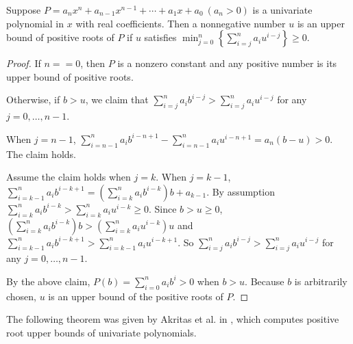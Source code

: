 \documentclass[10pt,a4paper]{article}
\begin{document}
\begin{theorem} \label{thm:log}
  Suppose   $P=a_nx^n+a_{n-1}x^{n-1}+\cdots+a_1x+a_0\ (a_n>0)$  is a univariate polynomial in $x$ with real coefficients.  Then  a nonnegative number $u$ is an upper bound of positive roots of $P$ if $u$   satisfies $\min_{j=0}^{n}\left\{  \sum_{i=j}^n a_i u^{i-j}\right\}\ge0$.
\end{theorem}
\begin{proof}
  If $n= =0$, then $P$ is a nonzero constant and any positive number is its upper bound of positive roots.

  Otherwise, if $b>u$,  we claim that $\sum_{i=j}^na_ib^{i-j}> \sum_{i=j}^na_iu^{i-j}$ for any $j= 0,\ldots,n-1$.

  When $j=n-1$, $\sum_{i=n-1}^na_ib^{i-n+1}-\sum_{i=n-1}^na_iu^{i-n+1}=a_n(b-u)>0.$ The claim holds.

  Assume the claim holds  when $j=k$. When $j=k-1$,  $\sum_{i=k-1}^na_ib^{i-k+1}=\left(\sum_{i=k}^na_ib^{i-k}\right)b+a_{k-1} $. By assumption
  $\sum_{i=k}^na_ib^{i-k}>\sum_{i=k}^na_iu^{i-k}\ge0$. Since $b>u\ge0$, $\left(\sum_{i=k}^na_ib^{i-k}\right)b>\left (\sum_{i=k}^na_iu^{i-k} \right)u  $
  and $\sum_{i=k-1}^na_ib^{i-k+1}> \sum_{i=k-1}^na_iu^{i-k+1}$. So  $\sum_{i=j}^na_ib^{i-j}> \sum_{i=j}^na_iu^{i-j}$ for any $j= 0,\ldots,n-1$.


  By the above claim,   $P(b)=\sum_{i=0}^na_ib^i>0$ when  $b>u$. Because $b$ is arbitrarily chosen, $u$ is an upper bound of the positive roots of $P$.

\end{proof}


The following theorem was given by Akritas et al. in  \cite{akr06,akr08}, which computes positive root upper bounds of univariate polynomials.
\end{document}
